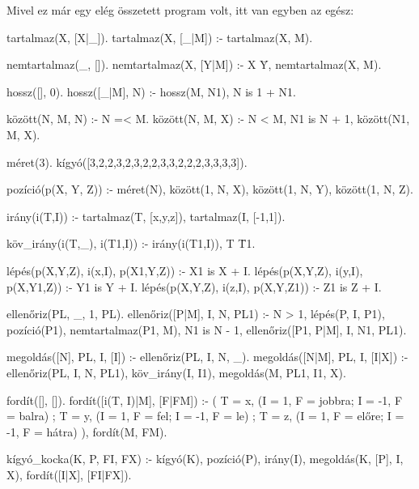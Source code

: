 Mivel ez már egy elég összetett program volt, itt
van egyben az egész:

\begin{program}
tartalmaz(X, [X|_]).
tartalmaz(X, [_|M]) :- tartalmaz(X, M).

nemtartalmaz(_, []).
nemtartalmaz(X, [Y|M]) :- X \= Y, nemtartalmaz(X, M).

hossz([], 0).
hossz([_|M], N) :- hossz(M, N1), N is 1 + N1.

között(N, M, N) :- N =< M.
között(N, M, X) :-
    N < M, N1 is N + 1,
    között(N1, M, X).

méret(3).
kígyó([3,2,2,3,2,3,2,2,3,3,2,2,2,3,3,3,3]).




pozíció(p(X, Y, Z)) :-
    méret(N), között(1, N, X),
    között(1, N, Y), között(1, N, Z).

irány(i(T,I)) :-
    tartalmaz(T, [x,y,z]),
    tartalmaz(I, [-1,1]).

köv_irány(i(T,_), i(T1,I)) :-
    irány(i(T1,I)), T \= T1.

lépés(p(X,Y,Z), i(x,I), p(X1,Y,Z)) :- X1 is X + I.
lépés(p(X,Y,Z), i(y,I), p(X,Y1,Z)) :- Y1 is Y + I.
lépés(p(X,Y,Z), i(z,I), p(X,Y,Z1)) :- Z1 is Z + I.

ellenőriz(PL, _, 1, PL).
ellenőriz([P|M], I, N, PL1) :-
    N > 1, lépés(P, I, P1),
    pozíció(P1), nemtartalmaz(P1, M), N1 is N - 1,
    ellenőriz([P1, P|M], I, N1, PL1).

megoldás([N], PL, I, [I]) :- ellenőriz(PL, I, N, _).
megoldás([N|M], PL, I, [I|X]) :-
    ellenőriz(PL, I, N, PL1), köv_irány(I, I1), 
    megoldás(M, PL1, I1, X).

fordít([], []).
fordít([i(T, I)|M], [F|FM]) :-
    (  T = x, (I = 1, F = jobbra; I = -1, F = balra)
     ; T = y, (I = 1, F = fel;    I = -1, F = le)
     ; T = z, (I = 1, F = előre;  I = -1, F = hátra)
    ), 
    fordít(M, FM).

kígyó_kocka(K, P, FI, FX) :-
    kígyó(K), pozíció(P), irány(I),
    megoldás(K, [P], I, X), fordít([I|X], [FI|FX]).
\end{program}

